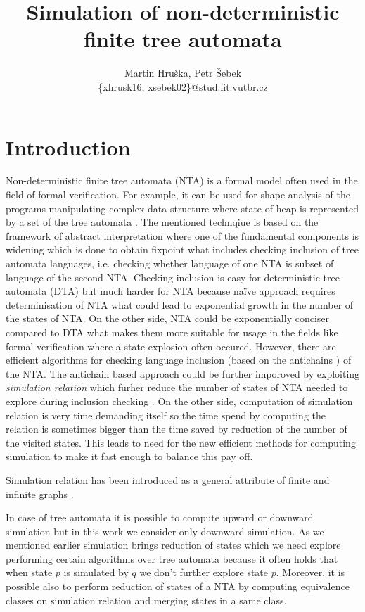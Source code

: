 \documentclass[a4paper, 12pt]{article}
\title{Simulation of non-deterministic finite tree automata}
\author{Martin Hruška, Petr Šebek\\\{xhrusk16, xsebek02\}@stud.fit.vutbr.cz}
\date{}
\begin{document}
\maketitle

\section{Introduction}
\label{sec:intro}


Non-deterministic finite tree automata (NTA) is a formal model often used in the field of formal verification.
For example, it can be used for shape analysis of the programs manipulating complex data structure where
state of heap is represented by a set of the tree automata \cite{methods12}.
The mentioned technqiue is based on the framework of abstract interpretation where one of the fundamental components
is widening which is done to obtain fixpoint what includes checking inclusion of tree automata languages, i.e.
checking whether language of one NTA is subset of language of the second NTA.
Checking inclusion is easy for deterministic tree automata (DTA) but much harder for NTA because
na{\"i}ve approach requires determinisation of NTA what could lead to exponential growth in the number of the states of NTA.
On the other side, NTA could be exponentially conciser compared to DTA what makes them more suitable for usage in the fields
like formal verification where a state explosion often occured.
However, there are efficient algorithms for checking language inclusion (based on the antichains \cite{tacas10}) of the NTA.
The antichain based approach could be further imporoved by exploiting \emph{simulation relation} which furher reduce
the number of states of NTA needed to explore during inclusion checking \cite{tacas10}.
On the other side, computation of simulation relation is very time demanding itself so the time spend by computing the relation
is sometimes bigger than the time saved by reduction of the number of the visited states.
This leads to need for the new efficient methods for computing simulation to make it fast enough to balance this pay off. 

Simulation relation has been introduced as a general attribute of finite and infinite graphs \cite{focs95}.

In case of tree automata it is possible to compute upward or downward simulation but in this
work we consider only downward simulation.
As we mentioned earlier simulation brings reduction of states which we need explore performing
certain algorithms over tree automata because it often holds that when state $p$ is simulated by $q$
we don't further explore state $p$.
Moreover, it is possible also to perform reduction of states of a NTA by computing
equivalence classes on simulation relation and merging states in a same class.
\end{document}
